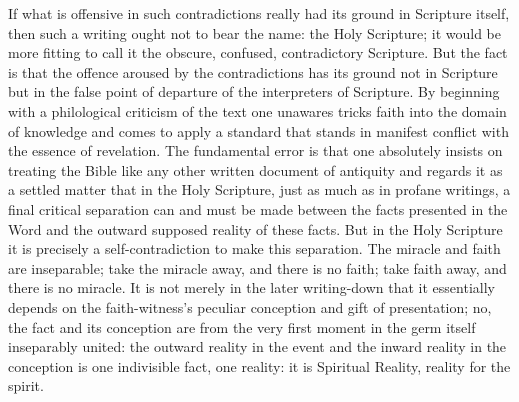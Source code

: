 \documentclass[12pt,a4paper,openany]{book}
\newcommand{\opage}[1]{\marginnote{\footnotesize\textit{[#1]}}}
\begin{document}
If what is offensive in such contradictions really
had its ground in Scripture itself, then such a writing ought
not to bear the name: the Holy Scripture; it would be more
fitting to call it the obscure, confused, contradictory
Scripture. But the fact is that the offence aroused by the contradictions
has its ground not in Scripture but in the false point of departure
of the interpreters of Scripture. By beginning with a philological
criticism of the text one unawares tricks faith into the
domain of knowledge and comes to apply a standard
that stands in manifest conflict with the essence of revelation.
The fundamental error is that one absolutely insists on treating the Bible
like any other written document of antiquity and regards it
as a settled matter that in the Holy Scripture, just as
much as in profane writings, a final critical
separation can and must be made between the facts
presented in the Word and the outward supposed
reality of these facts. But in the Holy Scripture it is
precisely a self-contradiction to make this separation. The miracle
and faith are inseparable; take the miracle away, and there
is no faith; take faith away, and there is no miracle.
It is not merely in the later writing-down that it
essentially depends on the faith-witness's peculiar
\setcounter{footnote}{0}%
\opage{16}conception and gift of presentation; no, the fact and
its conception are from the very first moment in the germ itself
inseparably united: the outward reality in the event
and the inward reality in the conception is one indivisible
fact, one reality: it is Spiritual Reality,
reality for the spirit.
\end{document}
